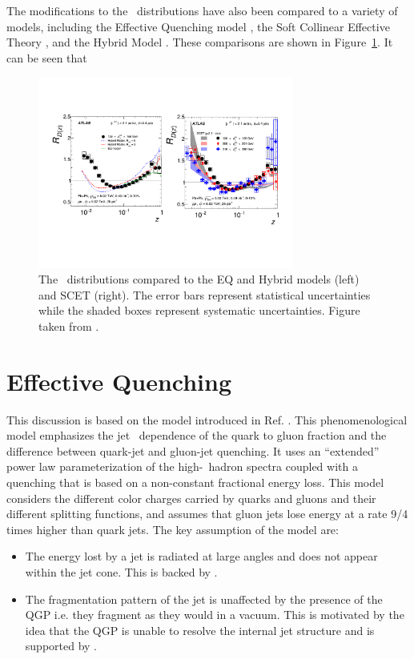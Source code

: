 The modifications to the \Dz\ distributions have also been compared to a variety of models, including the Effective Quenching model \cite{Spousta:2015fca}, the Soft Collinear Effective Theory \cite{Chien:2015vja, Kang:2017frl}, and the Hybrid Model \cite{Casalderrey-Solana:2014bpa}. These comparisons are shown in Figure~\ref{fig:jetff_rdz_theory}. It can be seen that 


\begin{figure}[htbp]
\begin{center}
\includegraphics[width=0.75\textwidth]{figures/jetMeasurements/jetff_rdz_theory}
\caption{The \Rdz\ distributions compared to the EQ and Hybrid models (left) and SCET (right). The error bars represent statistical uncertainties while the shaded boxes represent systematic uncertainties. Figure taken from \cite{PhysRevC.98.024908}.}
\label{fig:jetff_rdz_theory}
\end{center}
\end{figure}



\section{Effective Quenching}
This discussion is based on the model introduced in Ref. \cite{Spousta:2015fca}. This phenomenological model emphasizes the jet \pt\ dependence of the quark to gluon fraction and the difference between quark-jet and gluon-jet quenching. It uses an ``extended'' power law parameterization of the high-\pt\ hadron spectra coupled with a quenching that is based on a non-constant fractional energy loss. This model considers the different color charges carried by quarks and gluons and their different splitting functions, and assumes that gluon jets lose energy at a rate 9/4 times higher than quark jets. The key assumption of the model are:
\begin{itemize}
\item The energy lost by a jet is radiated at large angles and does not appear within the jet cone. This is backed by \cite{Chatrchyan:2011sx}.
\item The fragmentation pattern of the jet is unaffected by the presence of the QGP i.e. they fragment as they would in a vacuum. This is motivated by the idea that the QGP is unable to resolve the internal jet structure and is supported by \cite{Blaizot:2013hx, CasalderreySolana:2012ef}.
\end{itemize} 

